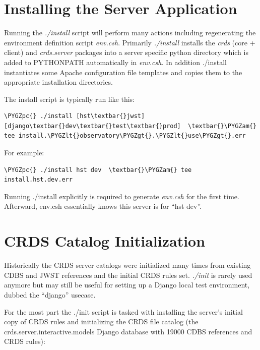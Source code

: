 \documentclass[letterpaper,10pt,english]{sphinxmanual}
\def\PYGZam{\char`\&}
\def\PYGZlt{\char`\<}
\def\PYGZgt{\char`\>}
\def\PYGZpc{\char`\%}
\begin{document}
\section{Installing the Server Application}
\label{server_guide:installing-the-server-application}
Running the \emph{./install} script will perform many actions including regenerating the environment definition script
\emph{env.csh}.  Primarily \emph{./install} installs the \emph{crds} (core + client) and \emph{crds.server} packages into
a server specific python directory which is added to PYTHONPATH automatically in \emph{env.csh}.  In addition ./install
instantiates some Apache configuration file templates and copies them to the appropriate installation directories.

The install script is typically run like this:

\begin{Verbatim}[commandchars=\\\{\}]
\PYGZpc{} ./install [hst\textbar{}jwst]  [django\textbar{}dev\textbar{}test\textbar{}prod]  \textbar{}\PYGZam{} tee install.\PYGZlt{}observatory\PYGZgt{}.\PYGZlt{}use\PYGZgt{}.err
\end{Verbatim}

For example:

\begin{Verbatim}[commandchars=\\\{\}]
\PYGZpc{} ./install hst dev  \textbar{}\PYGZam{} tee install.hst.dev.err
\end{Verbatim}

Running ./install explicitly is required to generate \emph{env.csh} for the first time.  Afterward,  env.csh essentially
knows this server is for ``hst dev''.


\section{CRDS Catalog Initialization}
\label{server_guide:crds-catalog-initialization}
Historically the CRDS server catalogs were initialized many times from existing CDBS and JWST references and
the initial CRDS rules set.  \emph{./init} is rarely used anymore but may still be useful for setting up a Django local
test environment, dubbed the ``django'' usecase.

For the most part the ./init script is tasked with installing the server's initial copy of CRDS rules and initializing
the CRDS file catalog (the crds.server.interactive.models Django database with 19000 CDBS references and CRDS rules):
\end{document}

